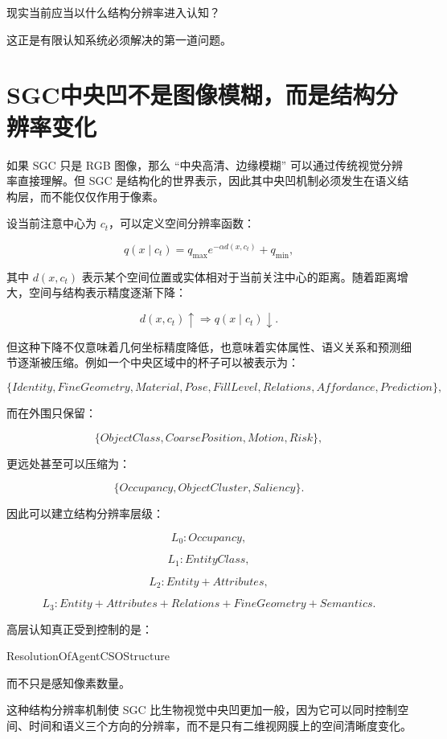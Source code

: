 \begin{statementbox}
现实当前应当以什么结构分辨率进入认知？
\end{statementbox}

这正是有限认知系统必须解决的第一道问题。

\section{SGC中央凹不是图像模糊，而是结构分辨率变化}

如果 SGC 只是 RGB 图像，那么 ``中央高清、边缘模糊'' 可以通过传统视觉分辨率直接理解。但 SGC 是结构化的世界表示，因此其中央凹机制必须发生在语义结构层，而不能仅仅作用于像素。

设当前注意中心为 $c_t$，可以定义空间分辨率函数：

\[
q(x\mid c_t)
=
q_{\max}
e^{-\alpha d(x,c_t)}
+
q_{\min},
\]

其中 $d(x,c_t)$ 表示某个空间位置或实体相对于当前关注中心的距离。随着距离增大，空间与结构表示精度逐渐下降：

\[
d(x,c_t)\uparrow
\Rightarrow
q(x\mid c_t)\downarrow.
\]

但这种下降不仅意味着几何坐标精度降低，也意味着实体属性、语义关系和预测细节逐渐被压缩。例如一个中央区域中的杯子可以被表示为：

\[
\{
Identity,
FineGeometry,
Material,
Pose,
FillLevel,
Relations,
Affordance,
Prediction
\},
\]

而在外围只保留：

\[
\{
ObjectClass,
CoarsePosition,
Motion,
Risk
\},
\]

更远处甚至可以压缩为：

\[
\{
Occupancy,
ObjectCluster,
Saliency
\}.
\]

因此可以建立结构分辨率层级：

\[
L_0: Occupancy,
\]

\[
L_1: EntityClass,
\]

\[
L_2: Entity+Attributes,
\]

\[
L_3:
Entity+Attributes+Relations+FineGeometry+Semantics.
\]

高层认知真正受到控制的是：

\begin{statementbox}
ResolutionOfAgentCSOStructure
\end{statementbox}

而不只是感知像素数量。

这种结构分辨率机制使 SGC 比生物视觉中央凹更加一般，因为它可以同时控制空间、时间和语义三个方向的分辨率，而不是只有二维视网膜上的空间清晰度变化。

